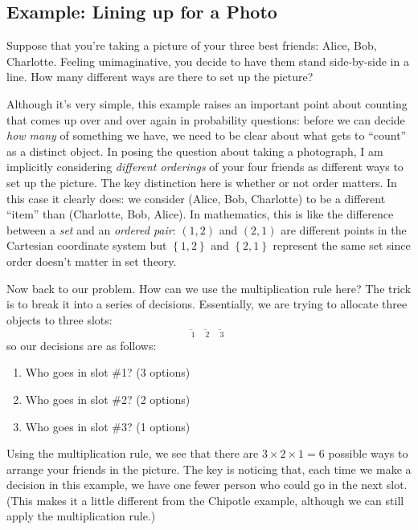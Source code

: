 \documentclass[12pt]{article}
\begin{document}
\subsection*{Example: Lining up for a Photo}
Suppose that you're taking a picture of your three best friends: Alice, Bob, Charlotte.
Feeling unimaginative, you decide to have them stand side-by-side in a line.
How many different ways are there to set up the picture?

Although it's very simple, this example raises an important point about counting that comes up over and over again in probability questions: before we can decide \emph{how many} of something we have, we need to be clear about what gets to ``count'' as a distinct object. 
In posing the question about taking a photograph, I am implicitly considering \emph{different orderings} of your four friends as different ways to set up the picture.
The key distinction here is whether or not order matters.
In this case it clearly does: we consider (Alice, Bob, Charlotte) to be a different ``item'' than (Charlotte, Bob, Alice).
In mathematics, this is like the difference between a \emph{set} and an \emph{ordered pair}: $(1,2)$ and $(2,1)$ are different points in the Cartesian coordinate system but $\left\{ 1,2 \right\}$ and $\left\{ 2,1 \right\}$ represent the same set since order doesn't matter in set theory.

Now back to our problem.
How can we use the multiplication rule here?
The trick is to break it into a series of decisions.
Essentially, we are trying to allocate three objects to three slots:
\begin{equation*}
  \underset{1}{\underbar{\quad}}\;
  \underset{2}{\underbar{\quad}}\;
  \underset{3}{\underbar{\quad}}\;
\end{equation*}
so our decisions are as follows:
\begin{enumerate}
  \item Who goes in slot \#1? (3 options)
  \item Who goes in slot \#2? (2 options)
  \item Who goes in slot \#3? (1 options)
\end{enumerate}
Using the multiplication rule, we see that there are $3 \times 2 \times 1 = 6$ possible ways to arrange your friends in the picture.
The key is noticing that, each time we make a decision in this example, we have one fewer person who could go in the next slot.
(This makes it a little different from the Chipotle example, although we can still apply the multiplication rule.)
\end{document}
